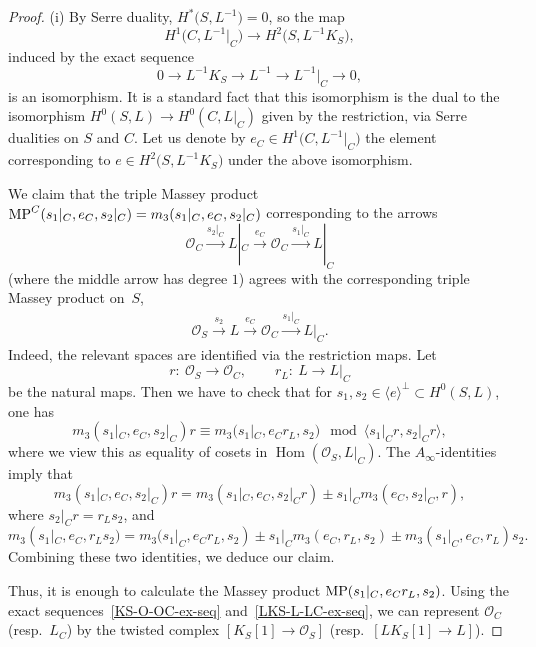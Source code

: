 \documentclass[pdftex]{sigma}
\numberwithin{equation}{section}
\newcommand{\Hom}{\operatorname{Hom}}
\newcommand{\OO}{{\mathcal O}}
\newcommand{\sub}{\subset}
\newcommand{\lan}{\langle}
\newcommand{\ran}{\rangle}
\begin{document}
\begin{proof}
(i) By Serre duality, $H^*\big(S,L^{-1}\big)=0$, so
the map
\[
H^1\big(C,L^{-1}\big|_C\big)\to H^2\big(S,L^{-1}K_S\big),
\]
induced by the exact sequence
\[
0\to L^{-1}K_S\to L^{-1}\to L^{-1}\big|_C\to 0,
\]
is an isomorphism.
It is a standard fact that this isomorphism is the dual to the isomorphism $H^0(S,L)\to H^0(C,L|_C)$ given by the restriction, via Serre dualities on $S$ and $C$.
Let us denote by $e_C\in H^1\big(C,L^{-1}\big|_C\big)$ the element corresponding to $e\in H^2\big(S,L^{-1}K_S\big)$ under the above isomorphism.

We claim that the triple Massey product ${\rm MP}^C(s_1|_C,e_C,s_2|_C)=m_3(s_1|_C,e_C,s_2|_C)$ corresponding to the arrows
\[\OO_C\overset{s_2|_C}{\longrightarrow} L|_C \overset{e_C}{\longrightarrow} \OO_C\overset{s_1|_C}{\longrightarrow} L|_C\]
(where the middle arrow has degree $1$) agrees with the corresponding triple Massey product on~$S$,
\begin{gather*}
\OO_S\overset{s_2}{\longrightarrow} L\overset{e_C}{\longrightarrow}\OO_C\overset{s_1|_C}{\longrightarrow} L|_C.
\end{gather*}
Indeed, the relevant spaces are identified via the restriction maps. Let
\[
r\colon \ \OO_S\to \OO_C, \qquad r_L\colon \ L\to L|_C
\]
 be the natural maps.
Then we have to check that for $s_1,s_2\in \lan e\ran^\perp\sub H^0(S,L)$, one has
\[m_3(s_1|_C,e_C,s_2|_C) r\equiv m_3(s_1|_C,e_Cr_L,s_2) \mod \lan s_1|_C r,s_2|_C r\ran,\]
where we view this as equality of cosets in $\Hom(\OO_S,L|_C)$.
The $A_\infty$-identities imply that
\[m_3(s_1|_C,e_C,s_2|_C)r= m_3(s_1|_C,e_C,s_2|_Cr)\pm s_1|_Cm_3(e_C,s_2|_C,r),\]
where $s_2|_Cr=r_Ls_2$, and
\[m_3(s_1|_C,e_C,r_Ls_2)=m_3(s_1|_C,e_Cr_L,s_2)\pm s_1|_Cm_3(e_C,r_L,s_2)\pm m_3(s_1|_C,e_C,r_L)s_2.\]
Combining these two identities, we deduce our claim.

Thus, it is enough to calculate the Massey product ${\rm MP}(s_1|_C,e_Cr_L,s_2)$.
Using the exact sequences~\eqref{KS-O-OC-ex-seq} and~\eqref{LKS-L-LC-ex-seq}, we can represent $\OO_C$ (resp.\ $L_C$) by the twisted complex $[K_S[1]\to \OO_S]$
(resp.\ $[LK_S[1]\to L]$).


\end{proof}
\end{document}
